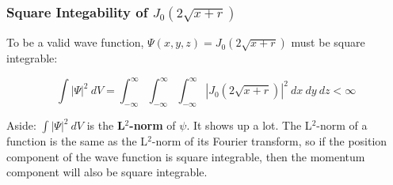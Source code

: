 \documentclass{beamer}
\begin{document}
\begin{frame}
\frametitle{Square Integability of $J_0(2\sqrt{x+r})$}


To be a valid wave function, $\Psi(x,y,z) = J_0(2\sqrt{x+r})$ must be square integrable:

\[ \int |\Psi|^2\ dV = \int_{-\infty}^{\infty} \int_{-\infty}^{\infty} \int_{-\infty}^{\infty} \left|J_0(2\sqrt{x+r})\right|^2\ dx\ dy\ dz  < \infty\]

Aside: $\int |\Psi|^2\ dV$ is the {\bf L$^2$-norm} of $\psi$.  It shows up a lot.  The L$^2$-norm of
a function is the same as the L$^2$-norm of its Fourier transform, so if the position component of the
wave function is square integrable, then the momentum component will also be square integrable.


\end{frame}
\end{document}
